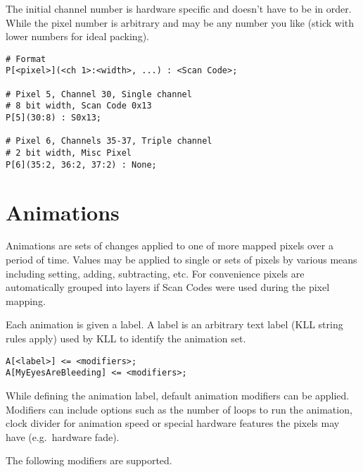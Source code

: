 \documentclass{kiibohd-template}
\begin{document}
The initial channel number is hardware specific and doesn't have to be in order.
While the pixel number is arbitrary and may be any number you like (stick with lower numbers for ideal packing).

\begin{lstlisting}
# Format
P[<pixel>](<ch 1>:<width>, ...) : <Scan Code>;

# Pixel 5, Channel 30, Single channel
# 8 bit width, Scan Code 0x13
P[5](30:8) : S0x13;

# Pixel 6, Channels 35-37, Triple channel
# 2 bit width, Misc Pixel
P[6](35:2, 36:2, 37:2) : None;
\end{lstlisting}


\section{Animations}
\label{sec:animations}

Animations are sets of changes applied to one of more mapped pixels over a period of time.
Values may be applied to single or sets of pixels by various means including setting, adding, subtracting, etc.
For convenience pixels are automatically grouped into layers if Scan Codes were used during the pixel mapping.

Each animation is given a label.
A label is an arbitrary text label (KLL string rules apply) used by KLL to identify the animation set.

\begin{lstlisting}
A[<label>] <= <modifiers>;
A[MyEyesAreBleeding] <= <modifiers>;
\end{lstlisting}

While defining the animation label, default animation modifiers can be applied.
Modifiers can include options such as the number of loops to run the animation, clock divider for animation speed or special hardware features the pixels may have (e.g.\ hardware fade).

The following modifiers are supported.
\end{document}
